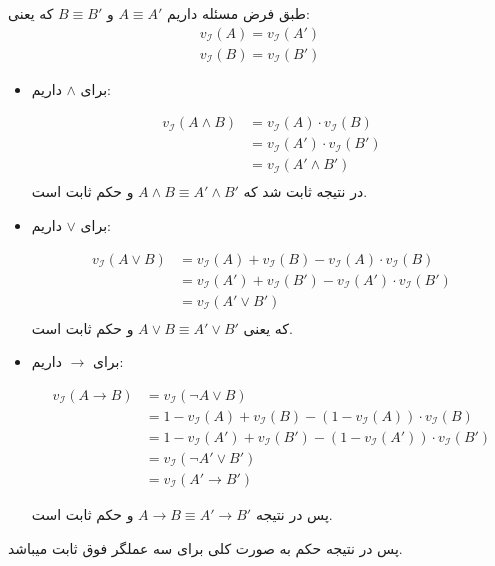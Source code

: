 \documentclass[]{exam}
\begin{document}
طبق فرض مسئله داریم 
$A \equiv A'$
و
$B \equiv B'$
که یعنی:
\begin{align*}
    v_\mathscr{I} (A) = v_\mathscr{I} (A')\\
    v_\mathscr{I} (B) = v_\mathscr{I} (B')
\end{align*}

\begin{itemize}
    \item برای
    $\land$
    داریم:
    
    \begin{align*}
        v_\mathscr{I} (A \land B) &= v_\mathscr{I} (A) \cdot v_\mathscr{I} (B)\\
        &= v_\mathscr{I} (A') \cdot v_\mathscr{I} (B')\\
        &= v_\mathscr{I} (A' \land B')\\
    \end{align*}
    در نتیجه ثابت شد که
    $A \land B \equiv A' \land B'$
    و حکم ثابت است. 

    \item برای
    $\lor$
    داریم:

    \begin{align*}
        v_\mathscr{I} (A \lor B) &= v_\mathscr{I} (A) + v_\mathscr{I} (B) - v_\mathscr{I} (A) \cdot v_\mathscr{I} (B)\\
        &= v_\mathscr{I} (A') + v_\mathscr{I} (B') - v_\mathscr{I} (A') \cdot v_\mathscr{I} (B')\\
        &= v_\mathscr{I} (A' \lor B')\\
    \end{align*}
    که یعنی 
    $A \lor B \equiv A' \lor B'$
    و حکم ثابت است.

    \item برای
    $\rightarrow$
    داریم:

    \begin{align*}
        v_\mathscr{I} (A \rightarrow B) &= v_\mathscr{I} (\neg A \lor B)\\
        &= 1 - v_\mathscr{I} (A) + v_\mathscr{I} (B) - (1 - v_\mathscr{I} (A)) \cdot v_\mathscr{I} (B)\\
        &= 1 - v_\mathscr{I} (A') + v_\mathscr{I} (B') - (1 - v_\mathscr{I} (A')) \cdot v_\mathscr{I} (B')\\
        &= v_\mathscr{I} (\neg A' \lor B')\\
        &= v_\mathscr{I} (A' \rightarrow B')
    \end{align*}

    پس در نتیجه
    $A \rightarrow B \equiv A' \rightarrow B'$
    و حکم ثابت است.
\end{itemize}
پس در نتیجه حکم به صورت کلی برای سه عملگر فوق ثابت میباشد.
\end{document}
